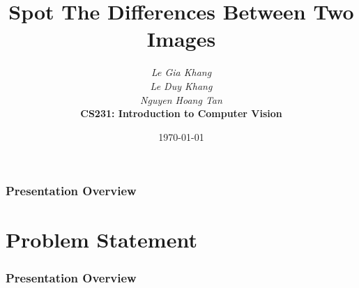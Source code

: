 \documentclass[13.5pt,aspecratio=169, xcolor=dvipsnames]{beamer}
\title{Spot The Differences Between Two Images}
\author[CS231]{\textit{Le Gia Khang \\ Le Duy Khang \\ Nguyen Hoang Tan }\\ \bigskip \textbf{CS231: Introduction to Computer Vision}}
\date{\today}
\begin{document}
\maketitle



\begin{frame}
    \doublespacing
        \frametitle{Presentation Overview} %
        
        \tableofcontents %
\end{frame}
    
    
    \section{Problem Statement} %
    \begin{frame}
        \doublespacing
            \frametitle{Presentation Overview} %
            
            \tableofcontents[currentsection] %
    \end{frame}

\end{document}
